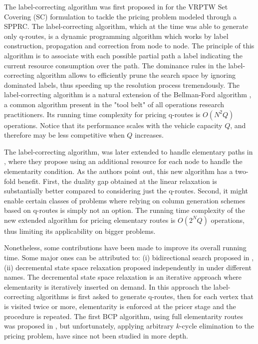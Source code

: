 The label-correcting algorithm was first proposed in \textcite{desrochers1992}
for the VRPTW Set Covering (SC) formulation
to tackle the pricing problem modeled through a SPPRC.
The label-correcting algorithm, which at the time was able to generate only q-routes,
is a dynamic programming algorithm
which works by label construction, propagation and correction from node to node.
The principle of this algorithm is to associate with each possible partial
path a label indicating the current resource consumption over the path.
The dominance rules in the label-correcting algorithm allows
to efficiently prune the search space by ignoring dominated labels, thus speeding
up the resolution process tremendously.
The label-correcting algorithm
is a natural extension of the Bellman-Ford algorithm \parencite{bellman1958, fordjr1956},
a common algorithm present in the "tool belt" of all operations research practitioners.
Its running time complexity for pricing q-routes is $O(N^2 Q)$ operations.
Notice that its performance scales with the vehicle capacity $Q$, and therefore
may be less competitive when $Q$ increases.

The label-correcting algorithm, was later extended to handle
elementary paths in \textcite{feillet2004},
where they propose using an additional resource for each node
to handle the elementarity condition.
As the authors point out, this new algorithm has a two-fold benefit.
First, the duality gap obtained at the linear relaxation is substantially better
compared to considering just the q-routes.
Second, it might enable certain classes of problems where relying
on column generation schemes based on q-routes is simply not an option.
The running time complexity of the new extended algorithm for pricing elementary routes
is $O(2^N Q)$ operations,
thus limiting its applicability on bigger problems.

Nonetheless, some contributions have been made to improve its overall running time.
Some major ones can be attributed to:
(i) bidirectional search proposed in \textcite{righini2006},
(ii) decremental state space relaxation proposed independently in
\textcite{boland2006, righini2008} under different names.
The decremental state space relaxation is an iterative
approach where elementarity is iteratively inserted on demand.
In this approach the label-correcting algorithms
is first asked to generate q-routes, then for each vertex that is visited
twice or more, elementarity is enforced at the pricer stage
and the procedure is repeated.
The first BCP algorithm, using full elementarity routes
was proposed in \cite{chabrier2006}, but unfortunately,
applying arbitrary $k$-cycle elimination to the pricing problem,
have since not been studied in more depth.


